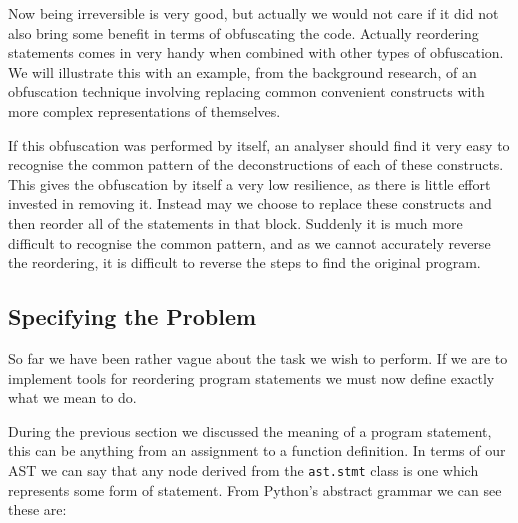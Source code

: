 \documentclass{report}
\begin{document}
Now being irreversible is very good, but actually we would not care if it did not also bring some benefit in terms of obfuscating the code. Actually
reordering statements comes in very handy when combined with other types of obfuscation. We will illustrate this with an example, from the background
research, of an obfuscation technique involving replacing common convenient constructs with more complex representations of themselves.

If this obfuscation was performed by itself, an analyser should find it very easy to recognise the common pattern of the deconstructions of each of these
constructs. This gives the obfuscation by itself a very low resilience, as there is little effort invested in removing it. Instead may we choose to replace
these constructs and then reorder all of the statements in that block. Suddenly it is much more difficult to recognise the common pattern, and as we cannot
accurately reverse the reordering, it is difficult to reverse the steps to find the original program.

\subsection{Specifying the Problem}

So far we have been rather vague about the task we wish to perform. If we are to implement tools for reordering program statements we must now
define exactly what we mean to do.

During the previous section we discussed the meaning of a program statement, this can be anything from an assignment to a function definition.
In terms of our AST we can say that any node derived from the \texttt{ast.stmt} class is one which represents some form of statement. From Python's
abstract grammar \cite{pyagrammar} we can see these are:
\end{document}
